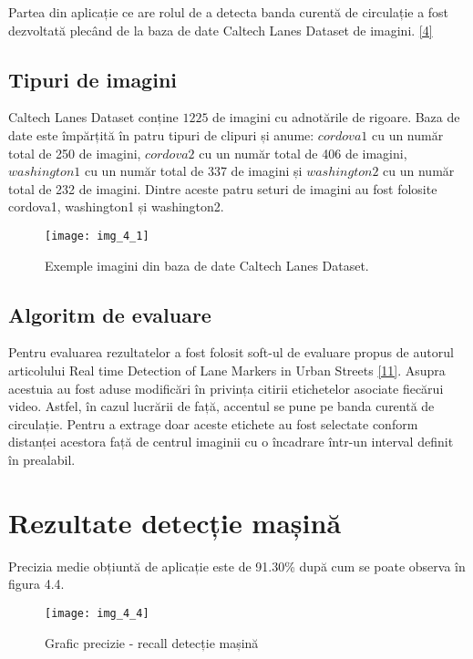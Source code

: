 Partea din aplicație ce are rolul de a detecta banda curentă de circulație a fost dezvoltată plecând de la baza de date Caltech Lanes Dataset de imagini.  \hyperlink{Bazadedatebenzidecirculatie}{[4]}

\subsection*{Tipuri de imagini}

Caltech Lanes Dataset conține $1225$ de imagini cu adnotările de rigoare. Baza de date este împărțită în patru tipuri de clipuri și anume: $cordova1$ cu un număr total de 250 de imagini, $cordova2$ cu un număr total de 406 de imagini, $washington1$ cu un număr total de 337 de imagini și $washington2$ cu un număr total de 232 de imagini. Dintre aceste patru seturi de imagini au fost folosite cordova1, washington1 și washington2.

\begin{figure}[!h]
	\centering
	\texttt{[image: img\_4\_1]}
	\caption[Imagini Caltech Lanes Dataset]{Exemple imagini din baza de date Caltech Lanes Dataset.}
\end{figure} 

\subsection*{Algoritm de evaluare}

Pentru evaluarea rezultatelor a fost folosit soft-ul de evaluare propus de autorul articolului Real time Detection of Lane Markers in Urban Streets \hyperlink{MohamedAly}{[11]}. 
Asupra acestuia au fost aduse modificări în privința citirii etichetelor asociate fiecărui video. Astfel, în cazul lucrării de față, accentul se pune pe banda curentă de circulație. Pentru a extrage doar aceste etichete au fost selectate conform distanței acestora față de centrul imaginii cu o încadrare într-un interval definit în prealabil.

\section{Rezultate detecție mașină}

Precizia medie obțiuntă de aplicație este de 91.30\% după cum se poate observa în figura 4.4.

\begin{figure}[!h]
	\centering
	\texttt{[image: img\_4\_4]}
	\caption{Grafic precizie - recall detecție mașină}
\end{figure}

